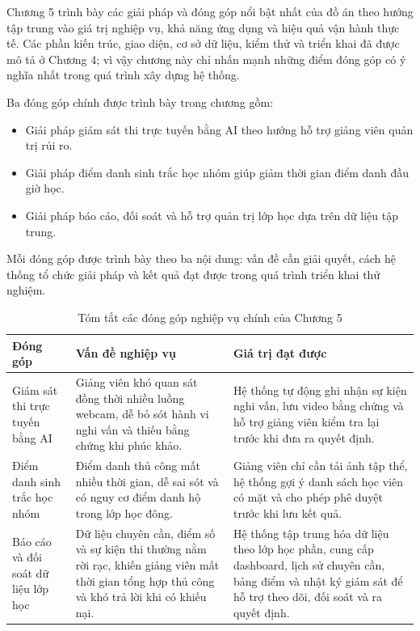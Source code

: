 \documentclass[../DoAn.tex]{subfiles}
\begin{document}
Chương 5 trình bày các giải pháp và đóng góp nổi bật nhất của đồ án theo hướng tập trung vào giá trị nghiệp vụ, khả năng ứng dụng và hiệu quả vận hành thực tế. Các phần kiến trúc, giao diện, cơ sở dữ liệu, kiểm thử và triển khai đã được mô tả ở Chương 4; vì vậy chương này chỉ nhấn mạnh những điểm đóng góp có ý nghĩa nhất trong quá trình xây dựng hệ thống.

Ba đóng góp chính được trình bày trong chương gồm:
\begin{itemize}
    \item Giải pháp giám sát thi trực tuyến bằng AI theo hướng hỗ trợ giảng viên quản trị rủi ro.
    \item Giải pháp điểm danh sinh trắc học nhóm giúp giảm thời gian điểm danh đầu giờ học.
    \item Giải pháp báo cáo, đối soát và hỗ trợ quản trị lớp học dựa trên dữ liệu tập trung.
\end{itemize}

Mỗi đóng góp được trình bày theo ba nội dung: vấn đề cần giải quyết, cách hệ thống tổ chức giải pháp và kết quả đạt được trong quá trình triển khai thử nghiệm.

\begin{table}[H]
\centering
\caption{Tóm tắt các đóng góp nghiệp vụ chính của Chương 5}
\label{table:chapter5_contribution_summary}
\begin{tabular}{|p{3.2cm}|p{4.4cm}|p{5.8cm}|}
\hline
\textbf{Đóng góp} & \textbf{Vấn đề nghiệp vụ} & \textbf{Giá trị đạt được} \\ \hline
Giám sát thi trực tuyến bằng AI &
Giảng viên khó quan sát đồng thời nhiều luồng webcam, dễ bỏ sót hành vi nghi vấn và thiếu bằng chứng khi phúc khảo. &
Hệ thống tự động ghi nhận sự kiện nghi vấn, lưu video bằng chứng và hỗ trợ giảng viên kiểm tra lại trước khi đưa ra quyết định. \\ \hline
Điểm danh sinh trắc học nhóm &
Điểm danh thủ công mất nhiều thời gian, dễ sai sót và có nguy cơ điểm danh hộ trong lớp học đông. &
Giảng viên chỉ cần tải ảnh tập thể, hệ thống gợi ý danh sách học viên có mặt và cho phép phê duyệt trước khi lưu kết quả. \\ \hline
Báo cáo và đối soát dữ liệu lớp học &
Dữ liệu chuyên cần, điểm số và sự kiện thi thường nằm rời rạc, khiến giảng viên mất thời gian tổng hợp thủ công và khó trả lời khi có khiếu nại. &
Hệ thống tập trung hóa dữ liệu theo lớp học phần, cung cấp dashboard, lịch sử chuyên cần, bảng điểm và nhật ký giám sát để hỗ trợ theo dõi, đối soát và ra quyết định. \\ \hline
\end{tabular}
\end{table}
\end{document}
